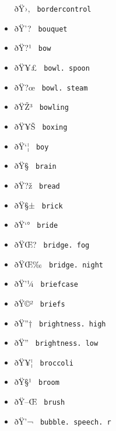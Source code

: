 \begin{itemize}
  \label{symbol-bordercontrol}{{ ðŸ›‚ }
  \texttt{\ bordercontrol\ }}
\item
  \label{symbol-bouquet}{{ ðŸ'? } \texttt{\ bouquet\ }}
\item
  \label{symbol-bow}{{ ðŸ?¹ } \texttt{\ bow\ }}
\item
  \label{symbol-bowl.spoon}{{ ðŸ¥£ }
  \texttt{\ bowl.\ spoon\ }}
\item
  \label{symbol-bowl.steam}{{ ðŸ?œ }
  \texttt{\ bowl.\ steam\ }}
\item
  \label{symbol-bowling}{{ ðŸŽ³ } \texttt{\ bowling\ }}
\item
  \label{symbol-boxing}{{ ðŸ¥Š } \texttt{\ boxing\ }}
\item
  \label{symbol-boy}{{ ðŸ`¦ } \texttt{\ boy\ }}
\item
  \label{symbol-brain}{{ ðŸ§ } \texttt{\ brain\ }}
\item
  \label{symbol-bread}{{ ðŸ?ž } \texttt{\ bread\ }}
\item
  \label{symbol-brick}{{ ðŸ§± } \texttt{\ brick\ }}
\item
  \label{symbol-bride}{{ ðŸ`° } \texttt{\ bride\ }}
\item
  \label{symbol-bridge.fog}{{ ðŸŒ? }
  \texttt{\ bridge.\ fog\ }}
\item
  \label{symbol-bridge.night}{{ ðŸŒ‰ }
  \texttt{\ bridge.\ night\ }}
\item
  \label{symbol-briefcase}{{ ðŸ'¼ }
  \texttt{\ briefcase\ }}
\item
  \label{symbol-briefs}{{ ðŸ©² } \texttt{\ briefs\ }}
\item
  \label{symbol-brightness.high}{{ ðŸ''† }
  \texttt{\ brightness.\ high\ }}
\item
  \label{symbol-brightness.low}{{ ðŸ'' }
  \texttt{\ brightness.\ low\ }}
\item
  \label{symbol-broccoli}{{ ðŸ¥¦ } \texttt{\ broccoli\ }}
\item
  \label{symbol-broom}{{ ðŸ§¹ } \texttt{\ broom\ }}
\item
  \label{symbol-brush}{{ ðŸ--Œ } \texttt{\ brush\ }}
\item
  \label{symbol-bubble.speech.r}{{ ðŸ'¬ }
  \texttt{\ bubble.\ speech.\ r\ }}

\end{itemize}
